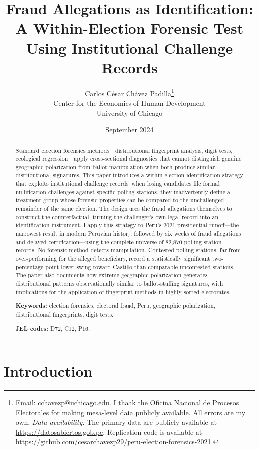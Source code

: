 \documentclass[12pt]{article}
\title{Fraud Allegations as Identification:\\
       A Within-Election Forensic Test Using Institutional Challenge Records}
\author{Carlos C\'esar Ch\'avez Padilla\thanks{%
  Email: \href{mailto:cchavezp@uchicago.edu}{cchavezp@uchicago.edu}.
  I thank the Oficina Nacional de Procesos Electorales for making
  mesa-level data publicly available. All errors are my own.
  \textit{Data availability:} The primary data are publicly available
  at \url{https://datosabiertos.gob.pe}. Replication code is available
  at \url{https://github.com/cesarchavezp29/peru-election-forensics-2021}.}\\[4pt]
  \normalsize Center for the Economics of Human Development\\
  \normalsize University of Chicago}
\date{September 2024}
\begin{document}
\maketitle
\thispagestyle{empty}

\begin{abstract}
\noindent
\begin{onehalfspacing}
Standard election forensics methods---distributional fingerprint analysis,
digit tests, ecological regression---apply cross-sectional diagnostics that
cannot distinguish genuine geographic polarization from ballot manipulation
when both produce similar distributional signatures. This paper introduces a
within-election identification strategy that exploits institutional challenge
records: when losing candidates file formal nullification challenges against
specific polling stations, they inadvertently define a treatment group whose
forensic properties can be compared to the unchallenged remainder of the same
election. The design uses the fraud allegations themselves to construct the
counterfactual, turning the challenger's own legal record into an
identification instrument. I apply this strategy to Peru's 2021 presidential
runoff---the narrowest result in modern Peruvian history, followed by six
weeks of fraud allegations and delayed certification---using the complete
universe of 82,870 polling-station records. No forensic method detects
manipulation. Contested polling stations, far from over-performing for the
alleged beneficiary, record a statistically significant two-percentage-point
lower swing toward Castillo than comparable uncontested stations. The paper
also documents how extreme geographic polarization generates distributional
patterns observationally similar to ballot-stuffing signatures, with
implications for the application of fingerprint methods in highly sorted
electorates.
\end{onehalfspacing}

\medskip
\noindent\textbf{Keywords:} election forensics, electoral fraud, Peru,
geographic polarization, distributional fingerprints, digit tests.

\medskip
\noindent\textbf{JEL codes:} D72, C12, P16.
\end{abstract}

\newpage

\section{Introduction}
\label{sec:intro}
\end{document}

